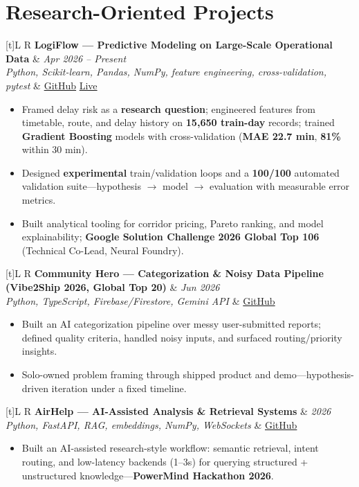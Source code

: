 \documentclass[a4paper,10pt]{article}
\newcommand{\resumeProject}[4]{%
  \vspace{0.5mm}
  \noindent
  \begin{tabularx}{\textwidth}[t]{L R}
    \textbf{#1} & \textit{#3} \\
    \textit{#2} & #4 \\
  \end{tabularx}
  \vspace{-0.5mm}%
}
\begin{document}
\section{Research-Oriented Projects}
\small

\resumeProject
  {LogiFlow --- Predictive Modeling on Large-Scale Operational Data}
  {Python, Scikit-learn, Pandas, NumPy, feature engineering, cross-validation, pytest}
  {Apr 2026 -- Present}
  {\href{https://github.com/Ojas-Srivastava05/LogiFlow-Solution-Challenge-2026}{GitHub} \textbar{} \href{https://logi-flow-solution-challenge-2026.vercel.app}{Live}}
\begin{itemize}
  \item Framed delay risk as a \textbf{research question}; engineered features from timetable, route, and delay history on \textbf{15,650 train-day} records; trained \textbf{Gradient Boosting} models with cross-validation (\textbf{MAE 22.7 min}, \textbf{81\%} within 30 min).
  \item Designed \textbf{experimental} train/validation loops and a \textbf{100/100} automated validation suite---hypothesis $\rightarrow$ model $\rightarrow$ evaluation with measurable error metrics.
  \item Built analytical tooling for corridor pricing, Pareto ranking, and model explainability; \textbf{Google Solution Challenge 2026 Global Top 106} (Technical Co-Lead, Neural Foundry).
\end{itemize}

\resumeProject
  {Community Hero --- Categorization \& Noisy Data Pipeline (Vibe2Ship 2026, Global Top 20)}
  {Python, TypeScript, Firebase/Firestore, Gemini API}
  {Jun 2026}
  {\href{https://github.com/Ojas-Srivastava05/community-hero}{GitHub}}
\begin{itemize}
  \item Built an AI categorization pipeline over messy user-submitted reports; defined quality criteria, handled noisy inputs, and surfaced routing/priority insights.
  \item Solo-owned problem framing through shipped product and demo---hypothesis-driven iteration under a fixed timeline.
\end{itemize}

\resumeProject
  {AirHelp --- AI-Assisted Analysis \& Retrieval Systems}
  {Python, FastAPI, RAG, embeddings, NumPy, WebSockets}
  {2026}
  {\href{https://github.com/Ojas-Srivastava05/AirHelp-AI-Airport-Assistant}{GitHub}}
\begin{itemize}
  \item Built an AI-assisted research-style workflow: semantic retrieval, intent routing, and low-latency backends (1--3s) for querying structured + unstructured knowledge---\textbf{PowerMind Hackathon 2026}.
\end{itemize}
\end{document}
